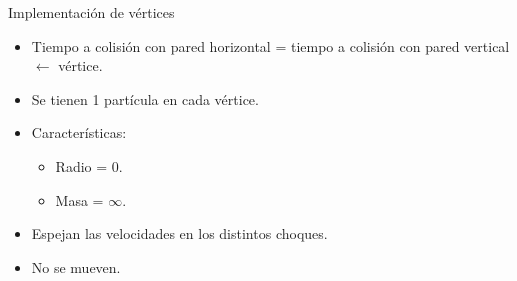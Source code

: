 \documentclass{beamer}
\begin{document}
\begin{frame}{Implementación de vértices}
  \begin{itemize}
    \item Tiempo a colisión con pared horizontal = tiempo a colisión con pared vertical $\leftarrow$ vértice.
    \item Se tienen 1 partícula en cada vértice.
    \item Características:
      \begin{itemize}
        \item Radio = 0.
        \item Masa = $\infty$.
      \end{itemize}
    \item Espejan las velocidades en los distintos choques.
    \item No se mueven.
  \end{itemize}
\end{frame}

\end{document}
